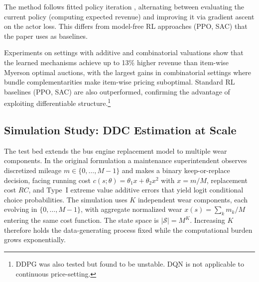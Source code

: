 The method follows fitted policy iteration \citep{bertsekastsitsiklis1996}, alternating between evaluating the current policy (computing expected revenue) and improving it via gradient ascent on the actor loss. This differs from model-free RL approaches (PPO, SAC) that the paper uses as baselines.

Experiments on settings with additive and combinatorial valuations show that the learned mechanisms achieve up to 13\% higher revenue than item-wise Myerson optimal auctions, with the largest gains in combinatorial settings where bundle complementarities make item-wise pricing suboptimal. Standard RL baselines (PPO, SAC) are also outperformed, confirming the advantage of exploiting differentiable structure.\footnote{DDPG was also tested but found to be unstable. DQN is not applicable to continuous price-setting.}


\subsection{Simulation Study: DDC Estimation at Scale}
\label{sec:ddc_estimation_sim}

The test bed extends the \citet{Rust1987} bus engine replacement model to multiple wear components. In the original formulation a maintenance superintendent observes discretized mileage $m\in\{0,\ldots,M{-}1\}$ and makes a binary keep-or-replace decision, facing running cost $c(s;\theta)=\theta_1 x+\theta_2 x^2$ with $x=m/M$, replacement cost $RC$, and Type~I extreme value additive errors that yield logit conditional choice probabilities. The simulation uses $K$ independent wear components, each evolving in $\{0,\ldots,M{-}1\}$, with aggregate normalized wear $x(s)=\sum_k m_k/M$ entering the same cost function. The state space is $|\mathcal{S}|=M^K$. Increasing $K$ therefore holds the data-generating process fixed while the computational burden grows exponentially.

